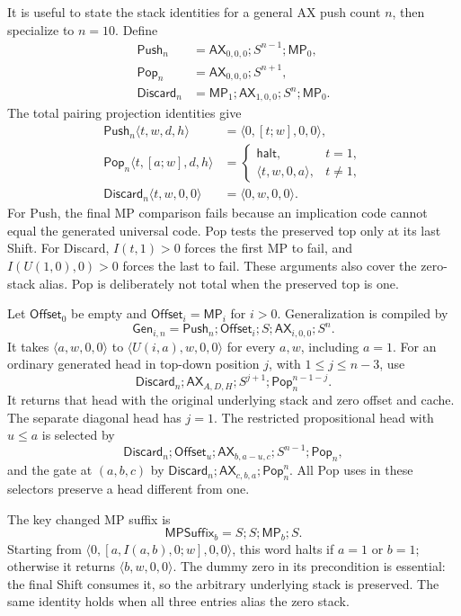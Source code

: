 It is useful to state the stack identities for a general AX push count
$n$, then specialize to $n=10$. Define
\begin{align*}
 \mathsf{Push}_n&=\mathsf{AX}_{0,0,0};S^{n-1};\mathsf{MP}_0,\\
 \mathsf{Pop}_n&=\mathsf{AX}_{0,0,0};S^{n+1},\\
 \mathsf{Discard}_n&=\mathsf{MP}_1;\mathsf{AX}_{1,0,0};S^n;\mathsf{MP}_0.
\end{align*}
The total pairing projection identities give
\begin{align*}
 \mathsf{Push}_n\langle t,w,d,h\rangle
  &=\langle0,[t;w],0,0\rangle,\\
 \mathsf{Pop}_n\langle t,[a;w],d,h\rangle
  &=\begin{cases}
    \mathsf{halt},&t=1,\\
    \langle t,w,0,a\rangle,&t\ne1,
    \end{cases}\\
 \mathsf{Discard}_n\langle t,w,0,0\rangle
  &=\langle0,w,0,0\rangle.
\end{align*}
For Push, the final MP comparison fails because an implication code
cannot equal the generated universal code. Pop tests the preserved top
only at its last Shift. For Discard, $I(t,1)>0$ forces the first MP to
fail, and $I(U(1,0),0)>0$ forces the last to fail. These arguments also
cover the zero-stack alias. Pop is deliberately not total when the
preserved top is one.

Let $\mathsf{Offset}_0$ be empty and
$\mathsf{Offset}_i=\mathsf{MP}_i$ for $i>0$. Generalization is compiled by
\[
 \mathsf{Gen}_{i,n}=
 \mathsf{Push}_n;\mathsf{Offset}_i;S;\mathsf{AX}_{i,0,0};S^n.
\]
It takes $\langle a,w,0,0\rangle$ to
$\langle U(i,a),w,0,0\rangle$ for every $a,w$, including $a=1$.
For an ordinary generated head in top-down position $j$, with
$1\le j\le n-3$, use
\[
 \mathsf{Discard}_n;\mathsf{AX}_{A,D,H};S^{j+1};
 \mathsf{Pop}_n^{n-1-j}.
\]
It returns that head with the original underlying stack and zero offset
and cache. The separate diagonal head has $j=1$. The restricted
propositional head with $u\le a$ is selected by
\[
 \mathsf{Discard}_n;\mathsf{Offset}_u;
 \mathsf{AX}_{b,a-u,c};S^{n-1};\mathsf{Pop}_n,
\]
and the gate at $(a,b,c)$ by
$\mathsf{Discard}_n;\mathsf{AX}_{c,b,a};\mathsf{Pop}_n^n$.
All Pop uses in these selectors preserve a head different from one.

The key changed MP suffix is
\[
 \mathsf{MPSuffix}_b=S;S;\mathsf{MP}_b;S.
\]
Starting from $\langle0,[a,I(a,b),0;w],0,0\rangle$, this word halts
if $a=1$ or $b=1$; otherwise it returns
$\langle b,w,0,0\rangle$. The dummy zero in its precondition is
essential: the final Shift consumes it, so the arbitrary underlying
stack is preserved. The same identity holds when all three entries
alias the zero stack.


